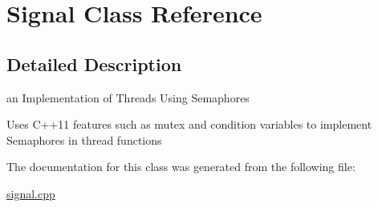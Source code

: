 \hypertarget{class_signal}{}\section{Signal Class Reference}
\label{class_signal}


\subsection{Detailed Description}
an Implementation of Threads Using Semaphores

Uses C++11 features such as mutex and condition variables to implement Semaphores in thread functions 

The documentation for this class was generated from the following file\+:\begin{DoxyCompactItemize}
\item 
\hyperlink{signal_8cpp}{signal.\+cpp}\end{DoxyCompactItemize}
